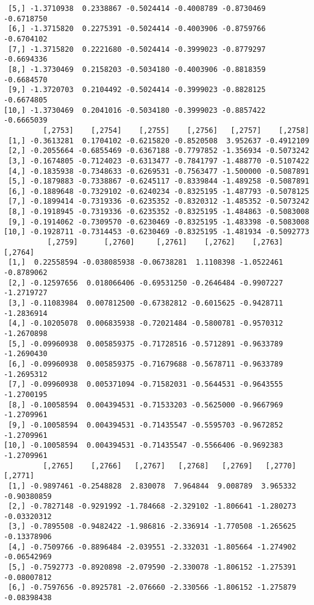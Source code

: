 \documentclass[
  letterpaper,
  DIV=11,
  numbers=noendperiod]{scrreprt}
\begin{document}
\begin{verbatim}
 [5,] -1.3710938  0.2338867 -0.5024414 -0.4008789 -0.8730469 -0.6718750
 [6,] -1.3715820  0.2275391 -0.5024414 -0.4003906 -0.8759766 -0.6704102
 [7,] -1.3715820  0.2221680 -0.5024414 -0.3999023 -0.8779297 -0.6694336
 [8,] -1.3730469  0.2158203 -0.5034180 -0.4003906 -0.8818359 -0.6684570
 [9,] -1.3720703  0.2104492 -0.5024414 -0.3999023 -0.8828125 -0.6674805
[10,] -1.3730469  0.2041016 -0.5034180 -0.3999023 -0.8857422 -0.6665039
         [,2753]    [,2754]    [,2755]    [,2756]   [,2757]    [,2758]
 [1,] -0.3613281  0.1704102 -0.6215820 -0.8520508  3.952637 -0.4912109
 [2,] -0.2055664 -0.6855469 -0.6367188 -0.7797852 -1.356934 -0.5073242
 [3,] -0.1674805 -0.7124023 -0.6313477 -0.7841797 -1.488770 -0.5107422
 [4,] -0.1835938 -0.7348633 -0.6269531 -0.7563477 -1.500000 -0.5087891
 [5,] -0.1879883 -0.7338867 -0.6245117 -0.8339844 -1.489258 -0.5087891
 [6,] -0.1889648 -0.7329102 -0.6240234 -0.8325195 -1.487793 -0.5078125
 [7,] -0.1899414 -0.7319336 -0.6235352 -0.8320312 -1.485352 -0.5073242
 [8,] -0.1918945 -0.7319336 -0.6235352 -0.8325195 -1.484863 -0.5083008
 [9,] -0.1914062 -0.7309570 -0.6230469 -0.8325195 -1.483398 -0.5083008
[10,] -0.1928711 -0.7314453 -0.6230469 -0.8325195 -1.481934 -0.5092773
          [,2759]      [,2760]     [,2761]    [,2762]    [,2763]    [,2764]
 [1,]  0.22558594 -0.038085938 -0.06738281  1.1108398 -1.0522461 -0.8789062
 [2,] -0.12597656  0.018066406 -0.69531250 -0.2646484 -0.9907227 -1.2719727
 [3,] -0.11083984  0.007812500 -0.67382812 -0.6015625 -0.9428711 -1.2836914
 [4,] -0.10205078  0.006835938 -0.72021484 -0.5800781 -0.9570312 -1.2670898
 [5,] -0.09960938  0.005859375 -0.71728516 -0.5712891 -0.9633789 -1.2690430
 [6,] -0.09960938  0.005859375 -0.71679688 -0.5678711 -0.9633789 -1.2695312
 [7,] -0.09960938  0.005371094 -0.71582031 -0.5644531 -0.9643555 -1.2700195
 [8,] -0.10058594  0.004394531 -0.71533203 -0.5625000 -0.9667969 -1.2709961
 [9,] -0.10058594  0.004394531 -0.71435547 -0.5595703 -0.9672852 -1.2709961
[10,] -0.10058594  0.004394531 -0.71435547 -0.5566406 -0.9692383 -1.2709961
         [,2765]    [,2766]   [,2767]   [,2768]   [,2769]   [,2770]     [,2771]
 [1,] -0.9897461 -0.2548828  2.830078  7.964844  9.008789  3.965332 -0.90380859
 [2,] -0.7827148 -0.9291992 -1.784668 -2.329102 -1.806641 -1.280273 -0.03320312
 [3,] -0.7895508 -0.9482422 -1.986816 -2.336914 -1.770508 -1.265625 -0.13378906
 [4,] -0.7509766 -0.8896484 -2.039551 -2.332031 -1.805664 -1.274902 -0.06542969
 [5,] -0.7592773 -0.8920898 -2.079590 -2.330078 -1.806152 -1.275391 -0.08007812
 [6,] -0.7597656 -0.8925781 -2.076660 -2.330566 -1.806152 -1.275879 -0.08398438

\end{verbatim}
\end{document}
